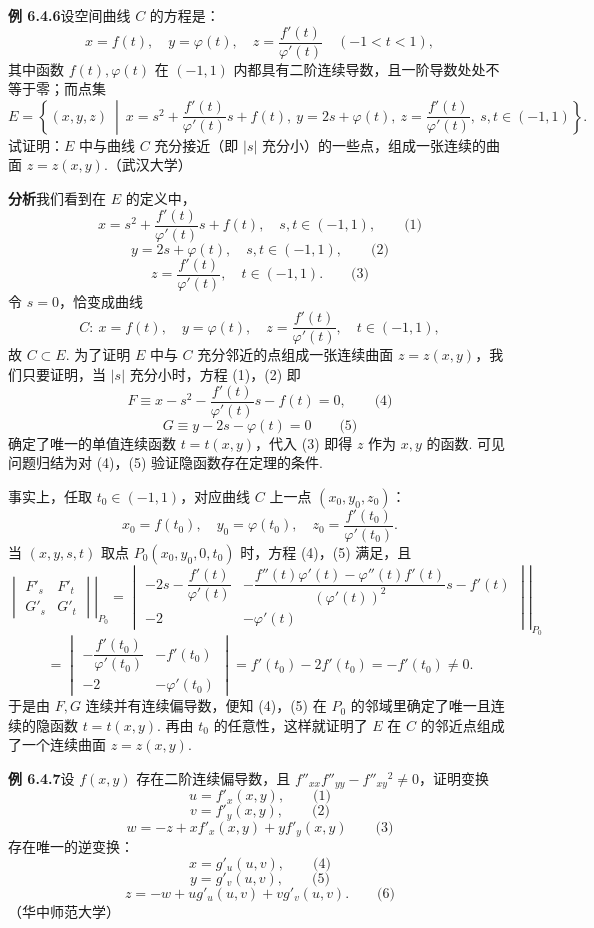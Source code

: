 \documentclass[UTF8,12pt,a4paper,fontset=fandol]{ctexart}
\begin{document}
\noindent\textbf{例 6.4.6}\quad 设空间曲线 $C$ 的方程是：
\[
  x=f(t),\quad y=\varphi(t),\quad
  z=\frac{f'(t)}{\varphi'(t)}\quad(-1<t<1),
\]
其中函数 $f(t),\varphi(t)$ 在 $(-1,1)$ 内都具有二阶连续导数，且一阶导数处处不等于零；而点集
\[
  E=\left\{(x,y,z)\ \middle|\ 
  x=s^2+\frac{f'(t)}{\varphi'(t)}s+f(t),\
  y=2s+\varphi(t),\
  z=\frac{f'(t)}{\varphi'(t)},\
  s,t\in(-1,1)\right\}.
\]
试证明：$E$ 中与曲线 $C$ 充分接近（即 $|s|$ 充分小）的一些点，组成一张连续的曲面 $z=z(x,y)$.（武汉大学）

\noindent\textbf{分析}\quad 我们看到在 $E$ 的定义中，
\[
  x=s^2+\frac{f'(t)}{\varphi'(t)}s+f(t),\quad s,t\in(-1,1), \qquad\text{(1)}
\]
\[
  y=2s+\varphi(t),\quad s,t\in(-1,1), \qquad\text{(2)}
\]
\[
  z=\frac{f'(t)}{\varphi'(t)},\quad t\in(-1,1). \qquad\text{(3)}
\]
令 $s=0$，恰变成曲线
\[
  C:\ x=f(t),\quad y=\varphi(t),\quad z=\frac{f'(t)}{\varphi'(t)},\quad t\in(-1,1),
\]
故 $C\subset E$. 为了证明 $E$ 中与 $C$ 充分邻近的点组成一张连续曲面 $z=z(x,y)$，我们只要证明，当 $|s|$ 充分小时，方程 (1)，(2) 即
\[
  F\equiv x-s^2-\frac{f'(t)}{\varphi'(t)}s-f(t)=0, \qquad\text{(4)}
\]
\[
  G\equiv y-2s-\varphi(t)=0 \qquad\text{(5)}
\]
确定了唯一的单值连续函数 $t=t(x,y)$，代入 (3) 即得 $z$ 作为 $x,y$ 的函数. 可见问题归结为对 (4)，(5) 验证隐函数存在定理的条件.

事实上，任取 $t_0\in(-1,1)$，对应曲线 $C$ 上一点 $(x_0,y_0,z_0)$：
\[
  x_0=f(t_0),\quad y_0=\varphi(t_0),\quad
  z_0=\frac{f'(t_0)}{\varphi'(t_0)}.
\]
当 $(x,y,s,t)$ 取点 $P_0(x_0,y_0,0,t_0)$ 时，方程 (4)，(5) 满足，且
\[
\left.\begin{vmatrix}
  F'_s & F'_t\\
  G'_s & G'_t
\end{vmatrix}\right|_{P_0}
=
\left.\begin{vmatrix}
  -2s-\dfrac{f'(t)}{\varphi'(t)} &
  -\dfrac{f''(t)\varphi'(t)-\varphi''(t)f'(t)}{(\varphi'(t))^2}s-f'(t)\\[6pt]
  -2 & -\varphi'(t)
\end{vmatrix}\right|_{P_0}
\]
\[
  =
\begin{vmatrix}
  -\dfrac{f'(t_0)}{\varphi'(t_0)} & -f'(t_0)\\[6pt]
  -2 & -\varphi'(t_0)
\end{vmatrix}
=f'(t_0)-2f'(t_0)=-f'(t_0)\ne0.
\]
于是由 $F,G$ 连续并有连续偏导数，便知 (4)，(5) 在 $P_0$ 的邻域里确定了唯一且连续的隐函数 $t=t(x,y)$. 再由 $t_0$ 的任意性，这样就证明了 $E$ 在 $C$ 的邻近点组成了一个连续曲面 $z=z(x,y)$.

\noindent\textbf{例 6.4.7}\quad 设 $f(x,y)$ 存在二阶连续偏导数，且
$f''_{xx}f''_{yy}-f''_{xy}{}^2\ne0$，证明变换
\[
  u=f'_x(x,y), \qquad\text{(1)}
\]
\[
  v=f'_y(x,y), \qquad\text{(2)}
\]
\[
  w=-z+xf'_x(x,y)+yf'_y(x,y) \qquad\text{(3)}
\]
存在唯一的逆变换：
\[
  x=g'_u(u,v), \qquad\text{(4)}
\]
\[
  y=g'_v(u,v), \qquad\text{(5)}
\]
\[
  z=-w+ug'_u(u,v)+vg'_v(u,v). \qquad\text{(6)}
\]
（华中师范大学）
\end{document}

